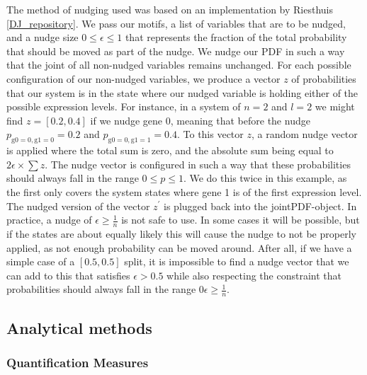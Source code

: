 \documentclass[../main.tex]{subfiles}
\begin{document}
The method of nudging used was based on an implementation by Riesthuis \ref{DJ_repository}.
We pass our motifs, a list of variables that are to be nudged, and a nudge size $0 \le \epsilon \le 1$ that represents the fraction of the total probability that should be moved as part of the nudge.
We nudge our PDF in such a way that the joint of all non-nudged variables remains unchanged. %
For each possible configuration of our non-nudged variables, we produce a vector $z$ of probabilities that our system is in the state where our nudged variable is holding either of the possible expression levels.
For instance, in a system of $n=2$ and $l=2$ we might find $z = [0.2, 0.4]$ if we nudge gene 0, meaning that before the nudge $p_\mathrm{g0 = 0, g1=0} = 0.2$ and $p_\mathrm{g0 = 0, g1=1} = 0.4$.
To this vector $z$, a random nudge vector is applied where the total sum is zero, and the absolute sum being equal to $2 \epsilon \times \sum z$. %
The nudge vector is configured in such a way that these probabilities should always fall in the range $0 \le p \le 1$.
We do this twice in this example, as the first only covers the system states where gene 1 is of the first expression level.
The nudged version of the vector $z^\prime$ is plugged back into the jointPDF-object.
In practice, a nudge of $\epsilon \ge \frac{1}{n}$ is not safe to use.
In some cases it will be possible, but if the states are about equally likely this will cause the nudge to not be properly applied, as not enough probability can be moved around.
After all, if we have a simple case of a $[0.5, 0.5]$ split, it is impossible to find a nudge vector that we can add to this that satisfies $\epsilon > 0.5$ while also respecting the constraint that probabilities should always fall in the range $0 \epsilon \ge \frac{1}{n}$.

\subsection{Analytical methods}

\subsubsection{Quantification Measures}
\end{document}
